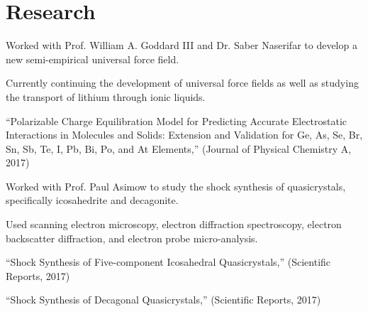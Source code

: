 \documentclass[letterpaper]{deedy-resume} %
\begin{document}
\begin{minipage}[t]{0.58\textwidth}






\section{Research}


\begin{tightitemize}
\item Worked with Prof. William A. Goddard III and Dr. Saber Naserifar to develop a new semi-empirical universal force field. 
\item Currently continuing the development of universal force fields as well as studying the transport of lithium through ionic liquids.
\item ``Polarizable Charge Equilibration Model for Predicting Accurate Electrostatic Interactions in Molecules and Solids: Extension and Validation for Ge, As, Se, Br, Sn, Sb, Te, I, Pb, Bi, Po, and At Elements,'' (Journal of Physical Chemistry A, 2017)
\end{tightitemize}



\begin{tightitemize}
\item Worked with Prof. Paul Asimow to study the shock synthesis of quasicrystals, specifically icosahedrite and decagonite.
\item Used scanning electron microscopy, electron diffraction spectroscopy, electron backscatter diffraction, and electron probe micro-analysis.
\item ``Shock Synthesis of Five-component Icosahedral Quasicrystals,'' (Scientific Reports, 2017)
\item ``Shock Synthesis of Decagonal Quasicrystals,'' (Scientific Reports, 2017)
\end{tightitemize}


\end{minipage}
\end{document}
